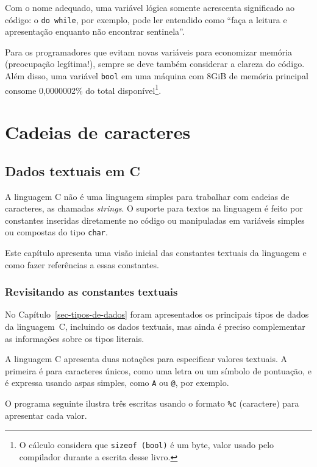 \documentclass[
  11pt,
  a4paper,
]{scrbook}
\begin{document}
Com o nome adequado, uma variável lógica somente acrescenta significado
ao código: o \texttt{do\ while}, por exemplo, pode ler entendido como
``faça a leitura e apresentação enquanto não encontrar sentinela''.

Para os programadores que evitam novas variáveis para economizar memória
(preocupação legítima!), sempre se deve também considerar a clareza do
código. Além disso, uma variável \texttt{bool} em uma máquina com 8GiB
de memória principal consome 0,0000002\% do total disponível\footnote{O
  cálculo considera que \texttt{sizeof\ (bool)} é um byte, valor usado
  pelo compilador durante a escrita desse livro.}.

\part{Cadeias de caracteres}

\chapter{Dados textuais em C}\label{sec-dados-textuais}

A linguagem C não é uma linguagem simples para trabalhar com cadeias de
caracteres, as chamadas \emph{strings}. O suporte para textos na
linguagem é feito por constantes inseridas diretamente no código ou
manipuladas em variáveis simples ou compostas do tipo \texttt{char}.

Este capítulo apresenta uma visão inicial das constantes textuais da
linguagem e como fazer referências a essas constantes.

\section{Revisitando as constantes
textuais}\label{revisitando-as-constantes-textuais}

No Capítulo~\ref{sec-tipos-de-dados} foram apresentados os principais
tipos de dados da linguagem~C, incluindo os dados textuais, mas ainda é
preciso complementar as informações sobre os tipos literais.

A linguagem C apresenta duas notações para especificar valores textuais.
A primeira é para caracteres únicos, como uma letra ou um símbolo de
pontuação, e é expressa usando aspas simples, como
\texttt{\textquotesingle{}A\textquotesingle{}} ou
\texttt{\textquotesingle{}@\textquotesingle{}}, por exemplo.

O programa seguinte ilustra três escritas usando o formato \texttt{\%c}
(caractere) para apresentar cada valor.
\end{document}
